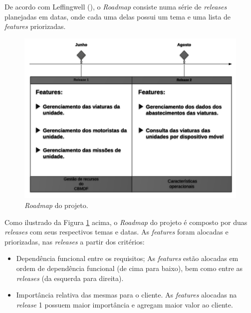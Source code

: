 
  De acordo com Leffingwell (\citeyear{leffingwell11}), o \textit{Roadmap} consiste numa série de \textit{releases} planejadas em datas, onde cada
  uma delas possui um tema e uma lista de \textit{features} priorizadas.
  
   \begin{figure}[!htbp]
    \centering
    \includegraphics[scale=0.4, angle=0]{figuras/roadmap}
    \caption[\textit{Roadmap} do projeto.]{\textit{Roadmap} do projeto.}
    \label{fig:roadmap}
  \end{figure}
  
  Como ilustrado da Figura \ref{fig:roadmap} acima, o \textit{Roadmap} do projeto é composto por duas \textit{releases} com seus
  respectivos temas e datas. As \textit{features} foram alocadas e priorizadas, nas \textit{releases} a partir dos critérios: 
  
  \begin{itemize}
   \item Dependência funcional entre os requisitos;
    \subitem As \textit{features} estão alocadas em ordem de dependência funcional (de cima para baixo), bem como entre as
    \textit{releases} (da esquerda para direita).
    
   \item Importância relativa das mesmas para o cliente.
    \subitem As \textit{features} alocadas na \textit{release} 1 possuem maior importância e agregam maior valor ao cliente.
  \end{itemize}
